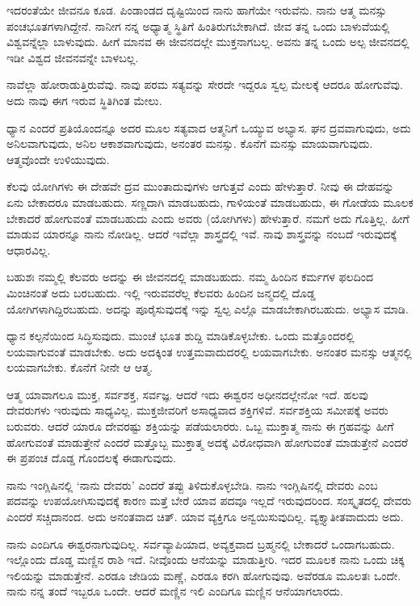 ಇದರಂತೆಯೇ ಜೀವನೂ ಕೂಡ. ಪಿಂಡಾಂಡದ ದೃಷ್ಟಿಯಿಂದ ನಾನು ಹಾಗೆಯೇ ಇರುವೆನು. ನಾನು ಆತ್ಮ ಮನಸ್ಸು ಪಂಚಭೂತಗಳಾಗಿದ್ದೇನೆ. ನಾನೀಗ ನನ್ನ ಅಧ್ಯಾತ್ಮ ಸ್ಥಿತಿಗೆ ಹಿಂತಿರುಗಬೇಕಾಗಿದೆ. ಜೀವ ತನ್ನ ಒಂದು ಬಾಳುವೆಯಲ್ಲಿ ವಿಶ್ವವನ್ನೆಲ್ಲಾ ಬಾಳುವುದು. ಹೀಗೆ ಮಾನವ ಈ ಜೀವನದಲ್ಲೇ ಮುಕ್ತನಾಗಬಲ್ಲ. ಅವನು ತನ್ನ ಒಂದು ಅಲ್ಪ ಜೀವನದಲ್ಲಿ ಇಡೀ ವಿಶ್ವದ ಜೀವನವನ್ನೇ ಬಾಳಬಲ್ಲ.

\newpage

ನಾವೆಲ್ಲಾ ಹೋರಾಡುತ್ತಿರುವೆವು. ನಾವು ಪರಮ ಸತ್ಯವನ್ನು ಸೇರದೇ ಇದ್ದರೂ ಸ್ವಲ್ಪ ಮೇಲಕ್ಕೆ ಆದರೂ ಹೋಗುವೆವು. ಅದು ನಾವು ಈಗ ಇರುವ ಸ್ಥಿತಿಗಿಂತ ಮೇಲು.

ಧ್ಯಾನ ಎಂದರೆ ಪ್ರತಿಯೊಂದನ್ನೂ ಅದರ ಮೂಲ ಸತ್ಯವಾದ ಆತ್ಮನಿಗೆ ಒಯ್ಯುವ ಅಭ್ಯಾಸ. ಘನ ದ್ರವವಾಗುವುದು, ಅದು ಅನಿಲವಾಗುವುದು, ಅನಿಲ ಆಕಾಶವಾಗುವುದು, ಅನಂತರ ಮನಸ್ಸು. ಕೊನೆಗೆ ಮನಸ್ಸು ಮಾಯವಾಗುವುದು. ಆತ್ಮವೊಂದೇ ಉಳಿಯುವುದು.

ಕೆಲವು ಯೋಗಿಗಳು ಈ ದೇಹವೇ ದ್ರವ ಮುಂತಾದುವುಗಳು ಆಗುತ್ತವೆ ಎಂದು ಹೇಳುತ್ತಾರೆ. ನೀವು ಈ ದೇಹವನ್ನು ಏನು ಬೇಕಾದರೂ ಮಾಡಬಹುದು. ಸಣ್ಣದಾಗಿ ಮಾಡಬಹುದು, ಗಾಳಿಯಂತೆ ಮಾಡಬಹುದು, ಈ ಗೋಡೆಯ ಮೂಲಕ ಬೇಕಾದರೆ ಹೋಗುವಂತೆ ಮಾಡಬಹುದು ಎಂದು ಅವರು (ಯೋಗಿಗಳು) ಹೇಳುತ್ತಾರೆ. ನಮಗೆ ಅದು ಗೊತ್ತಿಲ್ಲ. ಹೀಗೆ ಮಾಡುವ ಯಾರನ್ನೂ ನಾನು ನೋಡಿಲ್ಲ. ಆದರೆ ಇವೆಲ್ಲಾ ಶಾಸ್ತ್ರದಲ್ಲಿ ಇವೆ. ನಾವು ಶಾಸ್ತ್ರವನ್ನು ನಂಬದೆ ಇರುವುದಕ್ಕೆ ಆಧಾರವಿಲ್ಲ.

ಬಹುಶಃ ನಮ್ಮಲ್ಲಿ ಕೆಲವರು ಅದನ್ನು ಈ ಜೀವನದಲ್ಲಿ ಮಾಡಬಹುದು. ನಮ್ಮ ಹಿಂದಿನ ಕರ್ಮಗಳ ಫಲದಿಂದ ಮಿಂಚಿನಂತೆ ಅದು ಬರಬಹುದು. ಇಲ್ಲಿ ಇರುವವರೆಲ್ಲ ಕೆಲವರು ಹಿಂದಿನ ಜನ್ಮದಲ್ಲಿ ದೊಡ್ಡ ಯೋಗಿಗಳಾಗಿದ್ದಿರಬಹುದು. ಅದನ್ನು ಪೂರೈಸುವುದಕ್ಕೆ ಇನ್ನು ಸ್ವಲ್ಪ ಎಲ್ಲೊ ಮಾಡಬೇಕಾಗಿರಬಹುದು. ಅಭ್ಯಾಸ ಮಾಡಿ.

ಧ್ಯಾನ ಕಲ್ಪನೆಯಿಂದ ಸಿದ್ಧಿಸುವುದು. ಮುಂಚೆ ಭೂತ ಶುದ್ದಿ ಮಾಡಿಕೊಳ್ಳಬೇಕು. ಒಂದು ಮತ್ತೊಂದರಲ್ಲಿ ಲಯವಾಗುವಂತೆ ಮಾಡಬೇಕು. ಅದು ಅದಕ್ಕಿಂತ ಉತ್ತಮವಾದುದರಲ್ಲಿ ಲಯವಾಗಬೇಕು. ಅನಂತರ ಮನಸ್ಸು ಆತ್ಮನಲ್ಲಿ ಲಯವಾಗಬೇಕು. ಕೊನೆಗೆ ನೀನೇ ಆ ಆತ್ಮ.

ಆತ್ಮ ಯಾವಾಗಲೂ ಮುಕ್ತ, ಸರ್ವಶಕ್ತ, ಸರ್ವಜ್ಞ. ಆದರೆ ಇದು ಈಶ್ವರನ ಅಧೀನದಲ್ಲೇನೋ ಇದೆ. ಹಲವು ದೇವರುಗಳು ಇರುವುದು ಸಾಧ್ಯವಿಲ್ಲ. ಮುಕ್ತಜೀವರಿಗೆ ಅಸಾಧ್ಯವಾದ ಶಕ್ತಿಗಳಿವೆ. ಸರ್ವಶಕ್ತಿಯ ಸಮೀಪಕ್ಕೆ ಅವರು ಬರುವರು. ಆದರೆ ಯಾರೂ ದೇವರಷ್ಟು ಶಕ್ತಿಯನ್ನು ಪಡೆಯಲಾರರು. ಒಬ್ಬ ಮುಕ್ತಾತ್ಮ ನಾನು ಈ ಗ್ರಹವನ್ನು ಹೀಗೆ ಹೋಗುವಂತೆ ಮಾಡುತ್ತೇನೆ ಎಂದರೆ ಮತ್ತೊಬ್ಬ ಮುಕ್ತಾತ್ಮ ಅದಕ್ಕೆ ವಿರೋಧವಾಗಿ ಹೋಗುವಂತೆ ಮಾಡುತ್ತೇನೆ ಎಂದರೆ ಈ ಪ್ರಪಂಚ ದೊಡ್ಡ ಗೊಂದಲಕ್ಕೆ ಈಡಾಗುವುದು.

ನಾನು ಇಂಗ್ಲಿಷಿನಲ್ಲಿ `ನಾನು ದೇವರು' ಎಂದರೆ ತಪ್ಪು ತಿಳಿದುಕೊಳ್ಳಬೇಡಿ. ನಾನು ಇಂಗ್ಲಿಷಿನಲ್ಲಿ ದೇವರು ಎಂಬ ಪದವನ್ನು ಉಪಯೋಗಿಸುವುದಕ್ಕೆ ಕಾರಣ ಮತ್ತೆ ಬೇರೆ ಯಾವ ಪದವೂ ಇಲ್ಲದೆ ಇರುವುದರಿಂದ. ಸಂಸ್ಕೃತದಲ್ಲಿ ದೇವರು ಎಂದರೆ ಸಚ್ಚಿದಾನಂದ. ಅದು ಅನಂತವಾದ ಚಿತ್. ಯಾವ ವ್ಯಕ್ತಿಗೂ ಅನ್ವಯಿಸುವುದಿಲ್ಲ. ವ್ಯಕ್ತ್ಯಾತೀತವಾದುದು ಅದು.

ನಾನು ಎಂದಿಗೂ ಈಶ್ವರನಾಗುವುದಿಲ್ಲ. ಸರ್ವವ್ಯಾಪಿಯಾದ, ಅವ್ಯಕ್ತವಾದ ಬ್ರಹ್ಮನಲ್ಲಿ ಬೇಕಾದರೆ ಒಂದಾಗಬಹುದು. ಇಲ್ಲೊಂದು ದೊಡ್ಡ ಮಣ್ಣಿನ ರಾಶಿ ಇದೆ. ನೀವೊಂದು ಆನೆಯನ್ನು ಮಾಡುತ್ತೀರಿ. ಇದರ ಮೂಲಕ ನಾನು ಒಂದು ಚಿಕ್ಕ ಇಲಿಯನ್ನು ಮಾಡುತ್ತೇನೆ. ಎರಡೂ ಜೇಡಿಯ ಮಣ್ಣೆ, ಎರಡೂ ಕರಗಿ ಹೋಗುವುವು. ಅವೆರಡೂ ಮೂಲತಃ ಒಂದೇ. ನಾನು ನನ್ನ ತಂದೆ ಇಬ್ಬರೂ ಒಂದೇ. ಆದರೆ ಮಣ್ಣಿನ ಇಲಿ ಎಂದಿಗೂ ಮಣ್ಣಿನ ಆನೆಯಾಗಲಾರದು.

